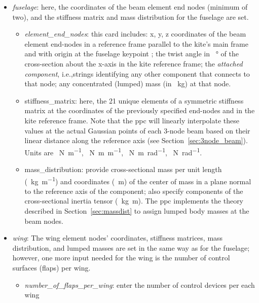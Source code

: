 \documentclass[report]{nrel}
\def\ie{i.e., }
\def\ie{i.e.,}
\begin{document}
\begin{itemize}
	\item \emph{fuselage}: here, the coordinates of the beam element end nodes (minimum of two), and the stiffness matrix and mass distribution for the fuselage are set.
	\begin{itemize}
		\item \emph{element\_end\_nodes}: this card includes: x, y, z coordinates of the beam element end-nodes in a reference frame parallel to the kite's main frame and with origin at the fuselage keypoint ; the twist angle in \SI{}{\degree} of the cross-section about the x-axis in the kite reference frame; the \emph{attached component}, \ie strings identifying any other component that connects to that node; any concentrated (lumped) mass (in \SI{}{\kg}) at that node.
		\item {stiffness\_matrix}: here, the 21 unique elements of a symmetric stiffness matrix at the coordinates of the previously specified end-nodes and in the kite reference frame. Note that the \gls{ppc} will linearly interpolate these values at the actual Gaussian points of each 3-node beam based on their linear distance along the reference axis (see Section~\ref{sec:3node_beam}).  Units are \SI{}{\N\per\m}, \SI{}{\N\m\per\m}, \SI{}{\N\m\per\radian}, \SI{}{\N\per\radian}.
		\item {mass\_distribution}: provide cross-sectional mass per unit length (\SI{}{\kg\per\m}) and coordinates (\SI{}{\m}) of the center of mass in a plane normal to the reference axis of the component; also specify components of the cross-sectional inertia tensor (\SI{}{\kg\m}). The \gls{ppc} implements the theory described in Section~\ref{sec:massdist} to assign lumped body masses at the beam nodes.
		
	\end{itemize}

%
	\item \emph{wing}: The wing element nodes' coordinates, stiffness matrices, mass distribution, and lumped masses are set in the same way as for the fuselage; however, one more input  needed for the wing is the number of control surfaces (flaps) per wing.
		\begin{itemize}
			\item \emph{number\_of\_flaps\_per\_wing}: enter the number of control devices per each wing
	

\end{itemize}
\end{itemize}
\end{document}
